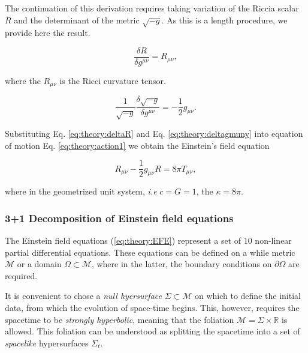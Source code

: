 {    
    
    The continuation of this derivation requires taking variation of the Riccia scalar $R$ and the determinant of the metric $\sqrt{-g}$. 
    As this is a length procedure, we provide here the result. 
    
    \begin{equation}
    \frac{\delta R}{\delta g^{\mu\nu}} = R_{\mu\nu},
    \label{eq:theory:deltaR}
    \end{equation}
    
    where the $R_{\mu\nu}$ is the Ricci curvature tensor.
    
    \begin{equation}
    \frac{1}{\sqrt{-g}}\frac{\delta\sqrt{-g}}{\delta g^{\mu\nu}} = -\frac{1}{2}g_{\mu\nu}.
    \label{eq:theory:deltagmuny}
    \end{equation}
    
    Substituting Eq. \ref{eq:theory:deltaR} and Eq. \ref{eq:theory:deltagmuny} into equation of motion Eq.  \ref{eq:theory:action1} we obtain the Einstein's field equation 
    
    \begin{equation}
    R_{\mu\nu} -\frac{1}{2}g_{\mu\nu}R=8\pi T_{\mu\nu},
    \label{eq:theory:EFE}
    \end{equation}
    
    where in the geometrized unit system, \textit{i.e} $c=G=1$, the $\kappa=8\pi$.
    
    \subsubsection{3+1 Decomposition of Einstein field equations}
    
    The Einstein field equations (\ref{eq:theory:EFE}) represent a set of $10$ non-linear partial differential equations.
    These equations can be defined on a while metric $\mathcal{M}$ or a domain $\Omega\subset\mathcal{M}$, where in the latter, the boundary conditions on $\partial\Omega$ are required. 
    
    It is convenient to chose a \textit{null hyersurface} $\Sigma\subset\mathcal{M}$ on which to define the initial data, from which the evolution of space-time begins. 
    This, however, requires the spacetime to be \textit{strongly hyperbolic}, meaning that the foliation $\mathcal{M}=\Sigma\times\mathbb{R}$ is allowed. 
    This foliation can be understood as splitting the spacetime into a set of \textit{spacelike} hypersurfaces $\Sigma_t$. 
    
}
